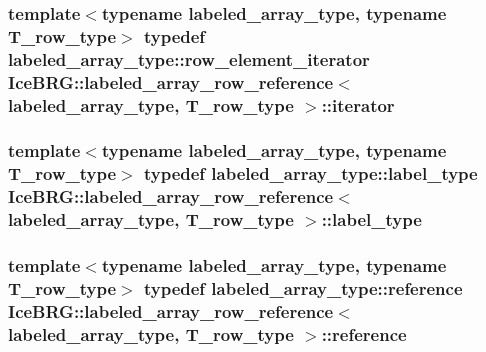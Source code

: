 \subsubsection[{iterator}]{\setlength{\rightskip}{0pt plus 5cm}template$<$typename labeled\+\_\+array\+\_\+type, typename T\+\_\+row\+\_\+type$>$ typedef labeled\+\_\+array\+\_\+type\+::row\+\_\+element\+\_\+iterator {\bf Ice\+B\+R\+G\+::labeled\+\_\+array\+\_\+row\+\_\+reference}$<$ labeled\+\_\+array\+\_\+type, T\+\_\+row\+\_\+type $>$\+::{\bf iterator}}\label{classIceBRG_1_1labeled__array__row__reference_a6019a8a167f6816b145f39478b2fb691}
\hypertarget{classIceBRG_1_1labeled__array__row__reference_a0b7e29867009277fee9102863be2d63a}{}
\subsubsection[{label\+\_\+type}]{\setlength{\rightskip}{0pt plus 5cm}template$<$typename labeled\+\_\+array\+\_\+type, typename T\+\_\+row\+\_\+type$>$ typedef labeled\+\_\+array\+\_\+type\+::label\+\_\+type {\bf Ice\+B\+R\+G\+::labeled\+\_\+array\+\_\+row\+\_\+reference}$<$ labeled\+\_\+array\+\_\+type, T\+\_\+row\+\_\+type $>$\+::{\bf label\+\_\+type}}\label{classIceBRG_1_1labeled__array__row__reference_a0b7e29867009277fee9102863be2d63a}
\hypertarget{classIceBRG_1_1labeled__array__row__reference_a24c2694c9ca46757f21f7024a229c925}{}
\subsubsection[{reference}]{\setlength{\rightskip}{0pt plus 5cm}template$<$typename labeled\+\_\+array\+\_\+type, typename T\+\_\+row\+\_\+type$>$ typedef labeled\+\_\+array\+\_\+type\+::reference {\bf Ice\+B\+R\+G\+::labeled\+\_\+array\+\_\+row\+\_\+reference}$<$ labeled\+\_\+array\+\_\+type, T\+\_\+row\+\_\+type $>$\+::{\bf reference}}\label{classIceBRG_1_1labeled__array__row__reference_a24c2694c9ca46757f21f7024a229c925}
\hypertarget{classIceBRG_1_1labeled__array__row__reference_a69e88ba1f1071a47fa00e4ec45f8147d}{}
